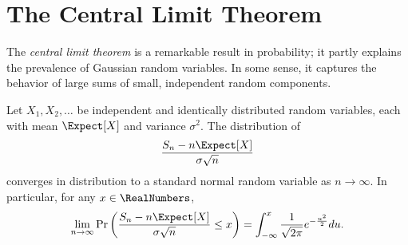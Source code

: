 \section{The Central Limit Theorem}

The \emph{central limit theorem} is a remarkable result in probability; it partly explains the prevalence of Gaussian random variables.
In some sense, it captures the behavior of large sums of small, independent random components.

\begin{theorem} 
Let $X_1, X_2, \ldots$ be independent and identically distributed random variables, each with mean $\Expect [X]$ and variance $\sigma^2$.
The distribution of
\begin{equation*}
\frac{ S_n - n \Expect [X] }{ \sigma \sqrt{n} }
\end{equation*}
converges in distribution to a standard normal random variable as $n \rightarrow \infty$.
In particular, for any $x \in \RealNumbers$,
\begin{equation*}
\lim_{n \rightarrow \infty}
\Pr \left( \frac{ S_n - n \Expect [X] }{ \sigma \sqrt{n} } \leq x \right)
= \int_{- \infty}^x \frac{1}{\sqrt{2 \pi}} e^{- \frac{u^2}{2}} du .
\end{equation*}
\end{theorem}

